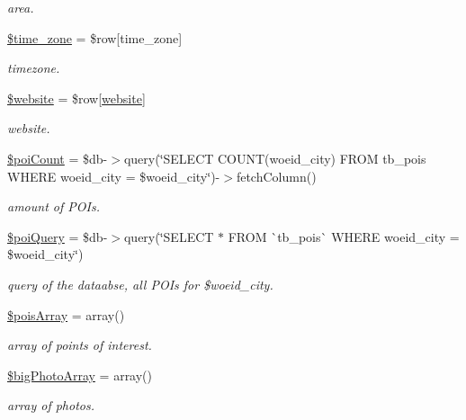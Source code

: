 \begin{DoxyCompactItemize}
\begin{DoxyCompactList}\small\item\em area. \end{DoxyCompactList}\item 
\mbox{\hyperlink{hull_2index_8php_adce4610b55a895abff73b5ed259c4bd3}{\$time\+\_\+zone}} = \$row\mbox{[}\textquotesingle{}time\+\_\+zone\textquotesingle{}\mbox{]}
\begin{DoxyCompactList}\small\item\em timezone. \end{DoxyCompactList}\item 
\mbox{\hyperlink{hull_2index_8php_a2887d41d3bb2498db735eeb87efa2d73}{\$website}} = \$row\mbox{[}\textquotesingle{}\mbox{\hyperlink{index_8php_a8c56014cff17c1ced653aa98455da680}{website}}\textquotesingle{}\mbox{]}
\begin{DoxyCompactList}\small\item\em website. \end{DoxyCompactList}\item 
\mbox{\hyperlink{hull_2index_8php_a8fb5f82500861c51c8fcfd700321e59e}{\$poi\+Count}} = \$db-\/$>$query(\char`\"{}S\+E\+L\+E\+CT C\+O\+U\+NT(woeid\+\_\+city) F\+R\+OM tb\+\_\+pois W\+H\+E\+RE woeid\+\_\+city = \$woeid\+\_\+city\char`\"{})-\/$>$fetch\+Column()
\begin{DoxyCompactList}\small\item\em amount of P\+O\+Is. \end{DoxyCompactList}\item 
\mbox{\hyperlink{hull_2index_8php_a735d09bd88bab2d39b5d123b6a1ac7e9}{\$poi\+Query}} = \$db-\/$>$query(\char`\"{}S\+E\+L\+E\+CT $\ast$ F\+R\+OM \`{}tb\+\_\+pois\`{} W\+H\+E\+RE woeid\+\_\+city = \$woeid\+\_\+city\char`\"{})
\begin{DoxyCompactList}\small\item\em query of the dataabse, all P\+O\+Is for \$woeid\+\_\+city. \end{DoxyCompactList}\item 
\mbox{\hyperlink{hull_2index_8php_aba22eb823924400ba310cca9821c67b3}{\$pois\+Array}} = array()
\begin{DoxyCompactList}\small\item\em array of points of interest. \end{DoxyCompactList}\item 
\mbox{\hyperlink{hull_2index_8php_aab544b20d0152a1bf9eeb8db3e9f0577}{\$big\+Photo\+Array}} = array()
\begin{DoxyCompactList}\small\item\em array of photos. \end{DoxyCompactList}\item 

\end{DoxyCompactItemize}
